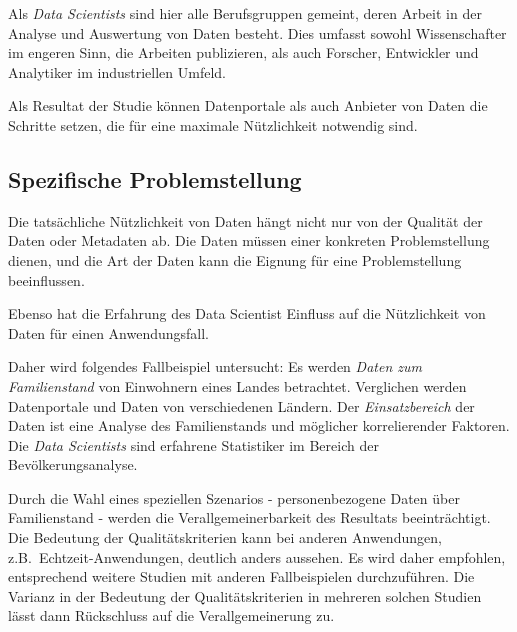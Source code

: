 \documentclass[a4paper,10pt,german,public]{INSOexpose}
\begin{document}
Als \emph{Data Scientists} sind hier alle Berufsgruppen gemeint,
deren Arbeit in der Analyse und Auswertung von Daten besteht.
Dies umfasst sowohl Wissenschafter im engeren Sinn, die Arbeiten
publizieren, als auch Forscher, Entwickler und Analytiker
im industriellen Umfeld.

Als Resultat der Studie können Datenportale als auch Anbieter von Daten die Schritte setzen, die für eine maximale Nützlichkeit notwendig sind.

\subsection{Spezifische Problemstellung}


Die tatsächliche Nützlichkeit von Daten hängt nicht nur von der Qualität der
Daten oder Metadaten ab.
Die Daten müssen einer konkreten Problemstellung dienen, und die Art der
Daten kann die Eignung für eine Problemstellung beeinflussen.

Ebenso hat die Erfahrung des Data Scientist Einfluss auf die Nützlichkeit von
Daten für einen Anwendungsfall.

Daher wird folgendes Fallbeispiel untersucht: 
Es werden \emph{Daten zum Familienstand}
von Einwohnern eines Landes betrachtet.
Verglichen werden Datenportale und Daten von verschiedenen Ländern.
Der \emph{Einsatzbereich} der Daten ist eine Analyse des Familienstands
und möglicher korrelierender Faktoren.
Die \emph{Data Scientists} sind erfahrene Statistiker im Bereich der Bevölkerungsanalyse.

Durch die Wahl eines speziellen Szenarios - personenbezogene Daten über Familienstand
- werden die Verallgemeinerbarkeit des Resultats beeinträchtigt.
Die Bedeutung der Qualitätskriterien kann bei anderen Anwendungen,
z.B.\ Echtzeit-Anwendungen,
deutlich anders aussehen.
Es wird daher empfohlen, entsprechend weitere Studien mit anderen Fallbeispielen
durchzuführen.
Die Varianz in der Bedeutung der Qualitätskriterien in mehreren solchen Studien lässt
dann Rückschluss auf die Verallgemeinerung zu.
\end{document}
